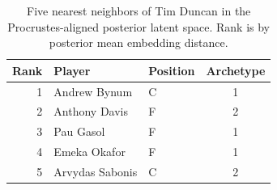 \begin{table}[htbp]
  \centering\small
  \begin{tabular}{rllc}
    \toprule
    Rank & Player & Position & Archetype \\
    \midrule
    1 & Andrew Bynum & C & 1 \\
    2 & Anthony Davis & F & 2 \\
    3 & Pau Gasol & F & 1 \\
    4 & Emeka Okafor & F & 1 \\
    5 & Arvydas Sabonis & C & 2 \\
    \bottomrule
  \end{tabular}
  \caption{Five nearest neighbors of Tim Duncan in the Procrustes-aligned posterior latent space. Rank is by posterior mean embedding distance.}
  \label{tab:Tim_Duncan_neighbors}
\end{table}

